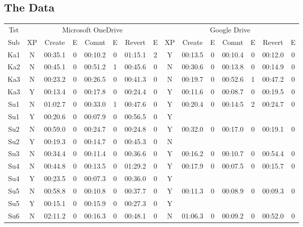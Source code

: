 \documentclass[a4paper,12pt]{article}
\begin{document}
\subsection{The Data}
\begin{center}
\footnotesize
\begin{tabular}{|c|c|c|c|c|c|c|c|c|c|c|c|c|c|c|}
		\hline
		Tst& \multicolumn{7}{c}{Microsoft OneDrive} & \multicolumn{7}{|c|}{Google Drive} \\
		Sub & XP&Create&E&Comnt&E&Revert&E&XP&Create&E&Comnt&E&Revert&E\\ \hline
Ka1&N&00:35.1&0&00:10.2&0&01:15.1&2&Y&00:13.5&0&00:10.4&0&00:12.0&0\\ \hline
Ka2&N&00:45.1&0&00:51.2&1&00:45.6&0&N&00:30.6&0&00:13.8&0&00:14.9&0\\ \hline
Ka3&N&00:23.2&0&00:26.5&0&00:41.3&0&N&00:19.7&0&00:52.6&1&00:47.2&0\\ \hline
Ka3&Y&00:13.4&0&00:17.8&0&00:24.4&0&Y&00:11.6&0&00:08.7&0&00:19.5&0\\ \hline
Su1&N&01:02.7&0&00:33.0&1&00:47.6&0&Y&00:20.4&0&00:14:5&2&00:24.7&0\\ \hline
Su1&Y&00:20.6&0&00:07.9&0&00:56.5&0&Y&\cellcolor[gray]{0.3}&\cellcolor[gray]{0.3}&\cellcolor[gray]{0.3}&\cellcolor[gray]{0.3}&\cellcolor[gray]{0.3}&\cellcolor[gray]{0.3}\\ \hline
Su2&N&00:59.0&0&00:24.7&0&00:24.8&0&Y&00:32.0&0&00:17.0&0&00:19.1&0\\ \hline
Su2&Y&00:19.3&0&00:14.7&0&00:45.3&0&N&\cellcolor[gray]{0.3}&\cellcolor[gray]{0.3}&\cellcolor[gray]{0.3}&\cellcolor[gray]{0.3}&\cellcolor[gray]{0.3}&\cellcolor[gray]{0.3}\\ \hline
Su3&N&00:34.4&0&00:11.4&0&00:36.6&0&Y&00:16.2&0&00:10.7&0&00:54.4&0\\ \hline
Su4&N&00:44.8&0&00:13.5&0&01:29.2&0&Y&00:17.9&0&00:07.5&0&00:15.7&0\\ \hline
Su4&Y&00:23.5&0&00:07.3&0&00:36.0&0&Y&\cellcolor[gray]{0.3}&\cellcolor[gray]{0.3}&\cellcolor[gray]{0.3}&\cellcolor[gray]{0.3}&\cellcolor[gray]{0.3}&\cellcolor[gray]{0.3}\\ \hline
Su5&N&00:58.8&0&00:10.8&0&00:37.7&0&Y&00:11.3&0&00:08.9&0&00:09.3&0\\ \hline
Su5&Y&00:15.1&0&00:15.9&0&00:27.3&0&Y&\cellcolor[gray]{0.3}&\cellcolor[gray]{0.3}&\cellcolor[gray]{0.3}&\cellcolor[gray]{0.3}&\cellcolor[gray]{0.3}&\cellcolor[gray]{0.3}\\ \hline
Su6&N&02:11.2&0&00:16.3&0&00:48.1&0&N&01:06.3&0&00:09.2&0&00:52.0&0\\ \hline

\end{tabular}
\end{center}
\end{document}
